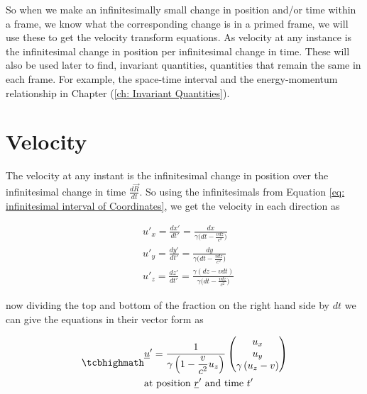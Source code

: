 So when we make an infinitesimally small change in position and/or time within a frame, we know what the corresponding change is in a primed frame, we will use these to get the velocity transform equations.
As velocity at any instance is the infinitesimal change in position per infinitesimal change in time.
These will also be used later to find, invariant quantities, quantities that remain the same in each frame.
For example, the space-time interval and the energy-momentum relationship in Chapter (\ref{ch: Invariant Quantities}).

\section{Velocity} \label{sect: Velocity}

The velocity at any instant is the infinitesimal change in position over the infinitesimal change in time $\frac{d\vec{R}}{dt}$.
So using the infinitesimals from Equation \eqref{eq: infinitesimal interval of Coordinates}, we get the velocity in each direction as

\begin{equation}
	\begin{aligned}
		 & u'_x = \frac{dx{'}}{dt{'}} = \frac{dx}{{\gamma} \bigg(dt-\frac{vdz}{{c}^2}\bigg) }                    \\
		 & u'_y = \frac{dy{'}}{dt{'}} = \frac{dy}{{\gamma} \bigg(dt-\frac{vdz}{{c}^2}\bigg) }                    \\
		 & u'_z = \frac{dz{'}}{dt{'}} = \frac{{\gamma} (dz - {v}dt)}{{\gamma} \bigg(dt-\frac{vdz}{{c}^2}\bigg) }
	\end{aligned}
\end{equation}

now dividing the top and bottom of the fraction on the right hand side by ${dt}$ we can give the equations in their vector form as

\begin{equation}
	\mhl{
		\begin{aligned}
			 & \underline{u}{'} = \dfrac{1}{{\gamma}\left(1-\dfrac{v}{{c}^2} {u_z}\right) }
			\begin{pmatrix}
				u_x                               \\
				u_y                               \\
				{\gamma} \left( u_z - {v} \right) \\
			\end{pmatrix}
			\\
			 & \text{at position ${\underline{r}{'}}$ and time ${t{'}}$ }
		\end{aligned}
	}
	\label{eq: velocity transform}
\end{equation}

